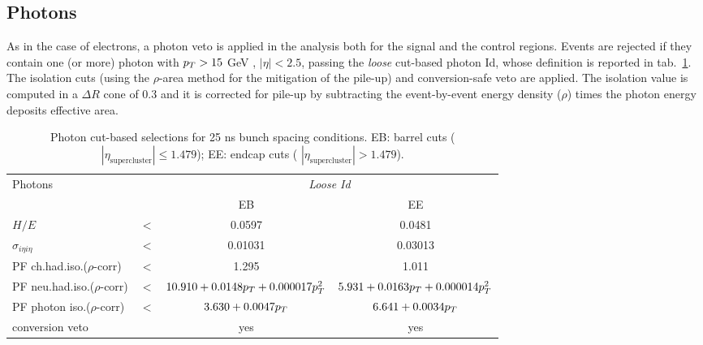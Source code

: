 
\subsection{Photons}
As in the case of electrons, a photon veto is applied in the analysis both for the signal and the control regions. Events are rejected if they contain one (or more) photon with $p_T > 15$ GeV , $|\eta| < 2.5$, passing the \emph{loose} cut-based photon Id, whose definition is reported in tab.~\ref{tab:PhotonId}. The isolation cuts (using the $\rho$-area method for the mitigation of the pile-up) and conversion-safe veto are applied. The isolation value is computed in a $\Delta R$ cone of 0.3 and it is corrected for pile-up by subtracting the event-by-event energy density ($\rho$) times the photon energy deposits effective area.

 \begin{table}[htb]
  \centering
  \caption{Photon cut-based selections for 25 ns bunch spacing conditions. EB: barrel cuts ( $|\eta_\text{supercluster}| \leq 1.479$); EE: endcap cuts ( $|\eta_\text{supercluster}| > 1.479$).}\label{tab:PhotonId}
     \begin{tabular}{l|ccc}
     Photons                                   &       & \multicolumn{2}{c}{\emph{Loose Id}}\\
                                               &       & EB      & EE  \\
  \hline
  \hline
     $H/E $                                    & $ < $ &0.0597   & 0.0481      \\
     $\sigma_{i\eta i\eta} $                   & $ < $ &0.01031  & 0.03013   \\
     PF ch.had.iso.($\rho$-corr)               & $ < $ &1.295    & 1.011   \\
     PF neu.had.iso.($\rho$-corr)              & $ < $ &$10.910+0.0148p_T+0.000017p_T^2$    &$5.931+0.0163p_T+0.000014p_T^2 $   \\
     PF photon iso.($\rho$-corr)               & $ < $ &$3.630+0.0047p_T$                 &$6.641+0.0034p_T $   \\
     conversion veto                           &       & yes     &yes     \\
 \end{tabular}

 \end{table}

